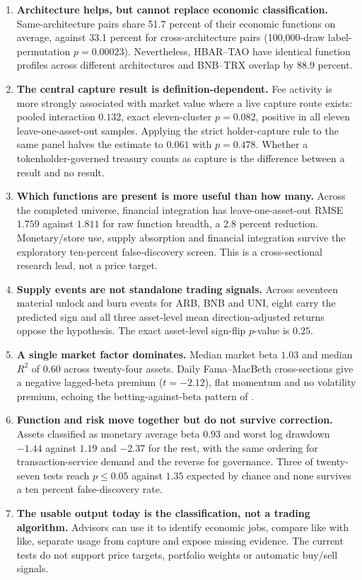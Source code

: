 \documentclass[10pt]{article}
\begin{document}
\begin{enumerate}
\item \textbf{Architecture helps, but cannot replace economic classification.} Same-architecture pairs share 51.7 percent of their economic functions on average, against 33.1 percent for cross-architecture pairs (100,000-draw label-permutation $p=0.00023$). Nevertheless, HBAR--TAO have identical function profiles across different architectures and BNB--TRX overlap by 88.9 percent.

\item \textbf{The central capture result is definition-dependent.} Fee activity is more strongly associated with market value where a live capture route exists: pooled interaction $0.132$, exact eleven-cluster $p = 0.082$, positive in all eleven leave-one-asset-out samples. Applying the strict holder-capture rule to the same panel halves the estimate to $0.061$ with $p = 0.478$. Whether a tokenholder-governed treasury counts as capture is the difference between a result and no result.

\item \textbf{Which functions are present is more useful than how many.} Across the completed universe, financial integration has leave-one-asset-out RMSE $1.759$ against $1.811$ for raw function breadth, a 2.8 percent reduction. Monetary/store use, supply absorption and financial integration survive the exploratory ten-percent false-discovery screen. This is a cross-sectional research lead, not a price target.

\item \textbf{Supply events are not standalone trading signals.} Across seventeen material unlock and burn events for ARB, BNB and UNI, eight carry the predicted sign and all three asset-level mean direction-adjusted returns oppose the hypothesis. The exact asset-level sign-flip $p$-value is $0.25$.

\item \textbf{A single market factor dominates.} Median market beta $1.03$ and median $R^2$ of $0.60$ across twenty-four assets. Daily Fama--MacBeth cross-sections give a negative lagged-beta premium ($t = -2.12$), flat momentum and no volatility premium, echoing the betting-against-beta pattern of \citet{frazzinipedersen2014}.

\item \textbf{Function and risk move together but do not survive correction.} Assets classified as monetary average beta $0.93$ and worst log drawdown $-1.44$ against $1.19$ and $-2.37$ for the rest, with the same ordering for transaction-service demand and the reverse for governance. Three of twenty-seven tests reach $p \le 0.05$ against $1.35$ expected by chance and none survives a ten percent false-discovery rate.

\item \textbf{The usable output today is the classification, not a trading algorithm.} Advisors can use it to identify economic jobs, compare like with like, separate usage from capture and expose missing evidence. The current tests do not support price targets, portfolio weights or automatic buy/sell signals.
\end{enumerate}
\end{document}
